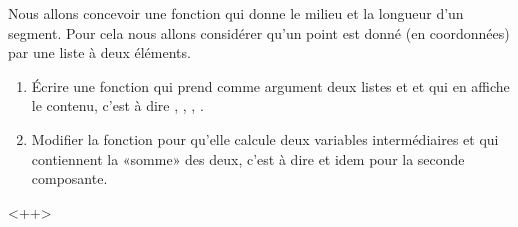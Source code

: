 
\begin{exercice}\label{exoPremiere-0068}

    Nous allons concevoir une fonction qui donne le milieu et la longueur d'un segment. Pour cela nous allons considérer qu'un point est donné (en coordonnées) par une liste \info{[x,y]} à deux éléments.

    \begin{enumerate}
        \item
            Écrire une fonction  qui prend comme argument deux listes  et  et qui en affiche le contenu, c'est à dire , , , .
        \item
            Modifier la fonction pour qu'elle calcule deux variables intermédiaires  et  qui contiennent la «somme» des deux, c'est à dire  et idem pour la seconde composante.
    \end{enumerate}
    <++>

\end{exercice}
